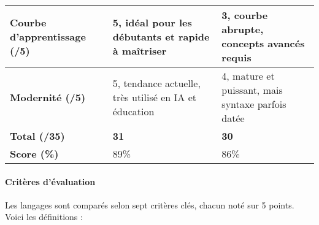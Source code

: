 \begin{longtable}{|p{}|p{}|p{}|}
\textbf{Courbe d’apprentissage (/5)} & 
5, idéal pour les débutants et rapide à maîtriser & 
3, courbe abrupte, concepts avancés requis \\
\hline

\textbf{Modernité (/5)} & 
5, tendance actuelle, très utilisé en IA et éducation & 
4, mature et puissant, mais syntaxe parfois datée \\
\hline

\textbf{Total (/35)} & 
\textbf{31} & 
\textbf{30} \\
\hline

\textbf{Score (\%)} & 
89\% & 
86\% \\
\hline

\end{longtable}


\paragraph{Critères d’évaluation}
Les langages sont comparés selon sept critères clés, chacun noté sur 5 points. 
Voici les définitions :

